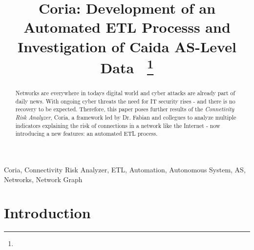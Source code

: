 \documentclass[conference, 11pt]{IEEEtran}
\begin{document}
			  
			  
\title{Coria: Development of an Automated ETL Processs and Investigation of Caida AS-Level Data\
{\footnotesize \textsuperscript{}}
\thanks{}
}

\author{
\and
{}
}

\maketitle
\thispagestyle{plain}
\pagestyle{plain}



\begin{abstract}
Networks are everywhere in todays digital world and cyber attacks are already part of daily news. With ongoing cyber threats the need for IT security rises - and there is no recovery to be expected. Therefore, this paper poses further results of the \textit{Connetivity Risk Analyzer}, Coria, a framework led by Dr. Fabian and collegues to analyze multiple indicators explaining the risk of connections in a network like the Internet - now introducing a new features: an automated ETL process.

\end{abstract}

\begin{IEEEkeywords}
Coria, Connectivity Risk Analyzer, ETL, Automation, Autonomous System, AS, Networks, Network Graph
\end{IEEEkeywords}


\section{Introduction}
\end{document}
